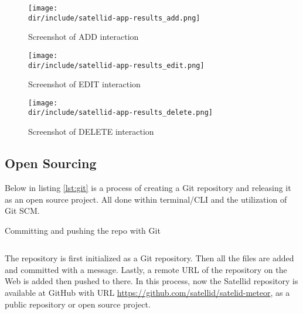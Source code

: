 \begin{figure}[!htp]
  \centering
  \texttt{[image: \\dir/include/satellid-app-results\_add.png]}
  \caption{Screenshot of ADD interaction}
  \label{fig:satellid-app-results_add}
\end{figure}

\begin{figure}[!htp]
  \centering
  \texttt{[image: \\dir/include/satellid-app-results\_edit.png]}
  \caption{Screenshot of EDIT interaction}
  \label{fig:satellid-app-results_edit}
\end{figure}

\begin{figure}[!htp]
  \centering
  \texttt{[image: \\dir/include/satellid-app-results\_delete.png]}
  \caption{Screenshot of DELETE interaction}
  \label{fig:satellid-app-results_delete}
\end{figure}


\subsection{Open Sourcing}

Below in listing \autoref{lst:git} is a process of creating a Git repository and releasing it as an open source project.
All done within terminal/\ac{CLI} and the utilization of Git \ac{SCM}.

\begin{listing}[!h]
\caption{Committing and pushing the repo with Git}
\inputminted{shell-session}{\dir/include/git.shell-session}
\label{lst:git}
\end{listing}

The repository is first initialized as a Git repository.
Then all the files are added and committed with a message.
Lastly, a remote \ac{URL} of the repository on the Web is added then pushed to there.
In this process, now the Satellid repository is available at GitHub with \ac{URL} \url{https://github.com/satellid/satelid-meteor}, as a public repository or open source project.
